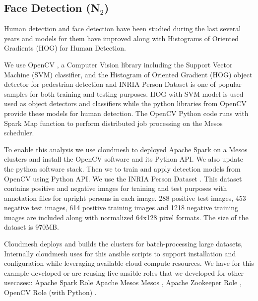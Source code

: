 \subsection{Face Detection (N$_2$)}

Human detection and face detection have been studied during the last
several years and models for them have improved along with Histograms
of Oriented Gradients (HOG) \cite{dalal2005histograms} for Human
Detection.



We use\cite{nist-facedetection} OpenCV \cite{bradski2000opencv}, a
Computer Vision library including the Support Vector Machine (SVM)
classifier, and the Histogram of Oriented Gradient (HOG)
\cite{dalal2005histograms}object detector for pedestrian detection and
INRIA Person Dataset is one of popular samples for both training and
testing purposes. HOG with SVM model is used used as object detectors
and classifiers while the python libraries from OpenCV provide these
models for human detection.  The OpenCV Python code runs with Spark
Map function to perform distributed job processing on the Mesos
scheduler.

To enable this analysis we use cloudmesh to deployed Apache Spark on a
Mesos clusters and install the OpenCV software and its Python API. We
also update the python software stack. Then we to train and apply
detection models from OpenCV using Python API. We use the INRIA Person
Dataset \cite{dalal2005inria}. This dataset contains positive and
negative images for training and test purposes with annotation files
for upright persons in each image. 288 positive test images, 453
negative test images, 614 positive training images and 1218 negative
training images are included along with normalized 64x128 pixel
formats. The size of the dataset is 970MB.

Cloudmesh deploys and builds the clusters for batch-processing large
datasets, Internally cloudmesh uses for this ansible scripts to
support installation and configuration while leveraging available
cloud compute resources. We have for this example developed or are
reusing five ansible roles that we developed for other usecases::
Apache Spark Role \cite{ansible-role-spark} Apache Mesos Mesos
\cite{hindman2011mesos}, Apache Zookeeper Role
\cite{hunt2010zookeeper}, OpenCV Role (with Python)
\cite{ansible-role-opencv}.


